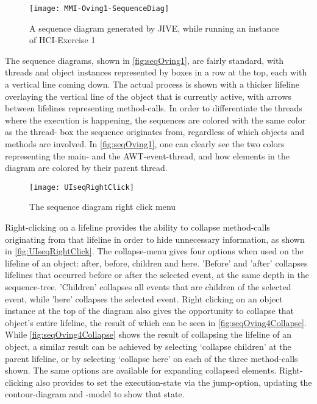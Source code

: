 \begin{figure}[H]
	\centering
	\texttt{[image: MMI-Oving1-SequenceDiag]}
	\caption{A sequence diagram generated by JIVE, while running an instance of HCI-Exercise 1}
	\label{fig:seqOving1}
\end{figure}
The sequence diagrams, shown in \autoref{fig:seqOving1}, are fairly standard, with threads and object instances represented by boxes in a row at the top, each with a vertical line coming down.
The actual process is shown with a thicker lifeline overlaying the vertical line of the object that is currently active, with arrows between lifelines representing method-calls.
In order to differentiate the threads where the execution is happening, the sequences are colored with the same color as the thread- box the sequence originates from, regardless of which objects and methods are involved.
In \autoref{fig:seqOving1}, one can clearly see the two colors representing the main- and the AWT-event-thread, and how elements in the diagram are colored by their parent thread.
\begin{figure}[H]
	\centering
	\texttt{[image: UIseqRightClick]}
	\caption{The sequence diagram right click menu}
	\label{fig:UIseqRightClick}
\end{figure}
Right-clicking on a lifeline provides the ability to collapse method-calls originating from that lifeline in order to hide unnecessary information, as shown in \autoref{fig:UIseqRightClick}.
The collapse-menu gives four options when used on the lifeline of an object: after, before, children and here.
'Before' and 'after' collapses lifelines that occurred before or after the selected event, at the same depth in the sequence-tree.
'Children' collapses all events that are children of the selected event, while 'here' collapses the selected event.
Right clicking on an object instance at the top of the diagram also gives the opportunity to collapse that object's entire lifeline, the result of which can be seen in \autoref{fig:seqOving4Collapse}.
While \autoref{fig:seqOving4Collapse} shows the result of collapsing the lifeline of an object, a similar result can be achieved by selecting `collapse children' at the parent lifeline, or by selecting `collapse here' on each of the three method-calls shown.
The same options are available for expanding collapsed elements.
Right-clicking also provides to set the execution-state via the jump-option, updating the contour-diagram and -model to show that state.


